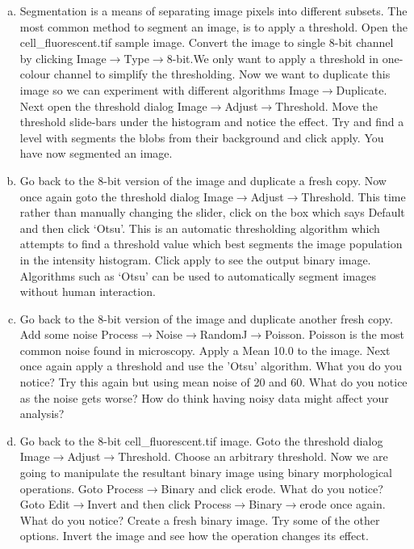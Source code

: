 \documentclass[a4paper,oneside,article]{memoir}
\begin{document}
\begin{enumerate}[(a)]
      \item \label{itm:automatic-threshold}
      Segmentation is a means of separating image pixels into
      different subsets. The most common method to segment an image,
      is to apply a threshold. Open the cell\_fluorescent.tif sample
      image. Convert the image to single 8-bit channel by clicking
      Image$\rightarrow$Type$\rightarrow$8-bit.We only want to apply
      a threshold in one-colour channel to simplify the thresholding.
      Now we want to duplicate this image so we can experiment with
      different algorithms Image$\rightarrow$Duplicate.  Next open
      the threshold dialog Image$\rightarrow$Adjust$\rightarrow$Threshold.
      Move the threshold slide-bars under the histogram and notice
      the effect. Try and find a level with segments the blobs from
      their background and click apply. You have now segmented an image.

      \item Go back to the 8-bit version of the image and duplicate
      a fresh copy. Now once again goto the threshold dialog
      Image$\rightarrow$Adjust$\rightarrow$Threshold. This time rather
      than manually changing the slider, click on the box which says
      Default and then click `Otsu'. This is an automatic thresholding
      algorithm which attempts to find a threshold value which best
      segments the image population in the intensity histogram. Click
      apply to see the output binary image. Algorithms such as `Otsu'
      can be used to automatically segment images without human
      interaction.

      \item Go back to the 8-bit version of the image and duplicate
      another fresh copy. Add some noise
      Process$\rightarrow$Noise$\rightarrow$RandomJ$\rightarrow$Poisson.
      Poisson is the most common noise found in microscopy. Apply a
      Mean 10.0 to the image. Next once again apply a threshold and
      use the 'Otsu' algorithm. What you do you notice? Try this again
      but using mean noise of 20 and 60. What do you notice as the
      noise gets worse? How do think having noisy data might affect
      your analysis?

      \item Go back to the 8-bit cell\_fluorescent.tif image. Goto the
      threshold dialog  Image$\rightarrow$Adjust$\rightarrow$Threshold.
      Choose an arbitrary threshold. Now we are going to manipulate the
      resultant binary image using binary morphological operations.
      Goto Process$\rightarrow$Binary and click erode. What do you
      notice? Goto Edit$\rightarrow$Invert and then click
      Process$\rightarrow$Binary$\rightarrow$erode once again. What do
      you notice? Create a fresh binary image. Try some of the other
      options. Invert the image and see how the operation changes its
      effect.
    \end{enumerate}
\end{document}
